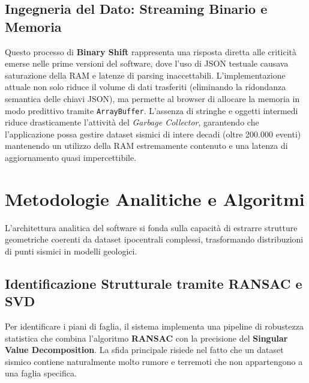 \documentclass[12pt,a4paper]{article}
\begin{document}
\subsection{Ingegneria del Dato: Streaming Binario e Memoria}
Questo processo di \textbf{Binary Shift} rappresenta una risposta diretta alle criticità emerse nelle prime versioni del software, dove l'uso di JSON testuale causava saturazione della RAM e latenze di parsing inaccettabili. L'implementazione attuale non solo riduce il volume di dati trasferiti (eliminando la ridondanza semantica delle chiavi JSON), ma permette al browser di allocare la memoria in modo predittivo tramite \texttt{ArrayBuffer}. L'assenza di stringhe e oggetti intermedi riduce drasticamente l'attività del \textit{Garbage Collector}, garantendo che l'applicazione possa gestire dataset sismici di intere decadi (oltre 200.000 eventi) mantenendo un utilizzo della RAM estremamente contenuto e una latenza di aggiornamento quasi impercettibile.

\section{Metodologie Analitiche e Algoritmi}
L'architettura analitica del software si fonda sulla capacità di estrarre strutture geometriche coerenti da dataset ipocentrali complessi, trasformando distribuzioni di punti sismici in modelli geologici.

\subsection{Identificazione Strutturale tramite RANSAC e SVD}
Per identificare i piani di faglia, il sistema implementa una pipeline di robustezza statistica che combina l'algoritmo \textbf{RANSAC} con la precisione del \textbf{Singular Value Decomposition}. La sfida principale risiede nel fatto che un dataset sismico contiene naturalmente molto rumore e terremoti che non appartengono a una faglia specifica.
\end{document}

